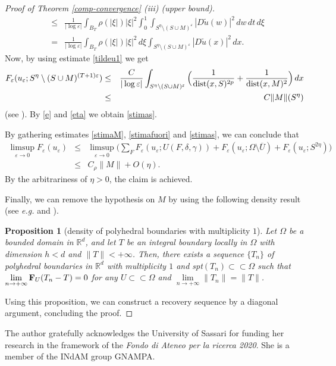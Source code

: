 \documentclass[11pt]{article}
\newtheorem{proposition}[definition]{Proposition}
\def\e{\varepsilon}
\begin{document}
\begin{proof}[Proof of Theorem {\rm\ref{comp-convergence}} {\rm (iii)} (upper bound)]
\begin{eqnarray*}
&\leq&
\frac{1}{|\log \e|}\int_{B_T}\rho(|\xi|) |\xi|^2 
\int_0^1\int_{S^\eta\setminus (S\cup M)^{\e}} 
|D\tilde u(w)|^2\,  dw\,dt\,d\xi\\
&=&
\frac{1}{|\log \e|}\int_{B_T}\rho(|\xi|) |\xi|^2 \,d\xi
\int_{S^\eta\setminus (S\cup M)^{\e}} 
|D\tilde u(x)|^2\,  dx. 
\end{eqnarray*}
Now, by using estimate \eqref{tildeu1} we get 
\begin{eqnarray}\label{eta}
F_\e(u_\e; S^\eta\setminus (S\cup M)^{(T+1)\e})
&\leq& \frac{C }{|\log\e|}  
\int_{S^\eta\setminus (S\cup M)^{\e}} 
\Big(\frac{1}{{\rm dist}(x,S)^{2p}}+\frac{1}{{\rm dist}(x,M)^{2}}\Big)\,  dx\nonumber\\
&\leq& C \|M\|(S^\eta)   
\end{eqnarray}
(see \cite[Lemma 3]{AC}). 
By \eqref{e} and \eqref{eta} we obtain \eqref{stimas}. 

By gathering estimates \eqref{stimaM}, \eqref{stimafuori} and \eqref{stimas}, we can conclude 
that 
\begin{eqnarray}
\limsup_{\e\to 0}F_\e(u_\e)&\leq&\limsup_{\e\to 0}\Big(\sum_{F} F_\e(u_\e; U(F,\delta,\gamma))+F_\e(u_\e; \Omega\setminus \overline U)+F_\e(u_\e; S^{2\eta})\Big)\nonumber \\
&\leq& C_\rho \|M\|+O(\eta)\nonumber.  
\end{eqnarray}
By the arbitrariness of $\eta>0$, the claim is achieved. 

Finally, we can remove the hypothesis on $M$ by using the following density result (see {\em e.g.} \cite[Proposition 2]{AC} and \cite{A, ABS}). 

\begin{proposition}[density of polyhedral boundaries with multiplicity $1$]\label{polydens} 
Let $\Omega$ be a bounded domain in $\mathbb R^d$, and let $T$ be an integral boundary locally in $\Omega$ with dimension $h<d$ and $\|T\|<+\infty$. Then, there exists a sequence $\{T_n\}$ of polyhedral boundaries in $\mathbb R^d$ with multiplicity $1$ and {\rm spt}$(T_n)\subset\subset\Omega$ such that $\lim\limits_{n\to+\infty}{\bf F}_{U}(T_n-T)=0$ for any $U\subset\subset \Omega$ 
and $\lim\limits_{n\to+\infty}\|T_n\|=\|T\|$.  
\end{proposition}
Using this proposition, we can construct a recovery sequence by a diagonal argument, concluding the proof.  
\end{proof}


 The author gratefully acknowledges the University of Sassari for funding her research in the framework of the {\em Fondo di Ateneo per la ricerca 2020}. She is a member of the INdAM group GNAMPA.  
\end{document}
